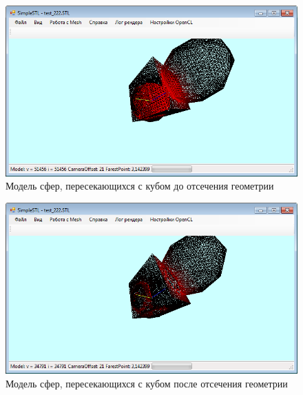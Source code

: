 \begin{figure}
	\center
	\includegraphics[width=1\textwidth]{atr2}
	\caption{Модель сфер, пересекающихся с кубом до отсечения геометрии}\label{atr2}
\end{figure}
\begin{figure}
	\center
	\includegraphics[width=1\textwidth]{atr3}
	\caption{Модель сфер, пересекающихся с кубом после отсечения геометрии}\label{atr3}
\end{figure}